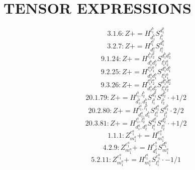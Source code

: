 \documentclass[letterpaper,10pt,fleqn,leqno,onecolumn]{article}
\begin{document}
\section{TENSOR EXPRESSIONS}
\begin{equation} \;\;\;\;\;\;  3.1.6: Z+=H^{l_{1}^{b}}_{d_{1}^{b}}S^{d_{1}^{b}}_{l_{1}^{b}} \end{equation}
\begin{equation} \;\;\;\;\;\;  3.2.7: Z+=H^{l_{1}^{a}}_{d_{1}^{a}}S^{d_{1}^{a}}_{l_{1}^{a}} \end{equation}
\begin{equation} \;\;\;\;\;\;  9.1.24: Z+=H^{l_{1}^{b}l_{2}^{b}}_{d_{1}^{b}d_{2}^{b}}S^{d_{1}^{b}d_{2}^{b}}_{l_{1}^{b}l_{2}^{b}} \end{equation}
\begin{equation} \;\;\;\;\;\;  9.2.25: Z+=H^{l_{1}^{a}l_{1}^{b}}_{d_{1}^{a}d_{1}^{b}}S^{d_{1}^{a}d_{1}^{b}}_{l_{1}^{a}l_{1}^{b}} \end{equation}
\begin{equation} \;\;\;\;\;\;  9.3.26: Z+=H^{l_{1}^{a}l_{2}^{a}}_{d_{1}^{a}d_{2}^{a}}S^{d_{1}^{a}d_{2}^{a}}_{l_{1}^{a}l_{2}^{a}} \end{equation}
\begin{equation} \;\;\;\;\;\;  20.1.79: Z+=H^{l_{1}^{b},l_{2}^{b}}_{d_{1}^{b},d_{2}^{b}}S^{d_{1}^{b}}_{l_{1}^{b}}S^{d_{2}^{b}}_{l_{2}^{b}}\cdot +1/2 \end{equation}
\begin{equation} \;\;\;\;\;\;  20.2.80: Z+=H^{l_{1}^{a},l_{1}^{b}}_{d_{1}^{a},d_{1}^{b}}S^{d_{1}^{a}}_{l_{1}^{a}}S^{d_{1}^{b}}_{l_{1}^{b}}\cdot 2/2 \end{equation}
\begin{equation} \;\;\;\;\;\;  20.3.81: Z+=H^{l_{1}^{a},l_{2}^{a}}_{d_{1}^{a},d_{2}^{a}}S^{d_{1}^{a}}_{l_{1}^{a}}S^{d_{2}^{a}}_{l_{2}^{a}}\cdot +1/2 \end{equation}
\begin{equation} \;\;\;\;\;\;  1.1.1: Z^{e_{1}^{a}}_{m_{1}^{a}}+=H^{e_{1}^{a}}_{m_{1}^{a}} \end{equation}
\begin{equation} \;\;\;\;\;\;  4.2.9: Z^{e_{1}^{a}}_{m_{1}^{a}}+=H^{e_{1}^{a}}_{d_{1}^{a}}S^{d_{1}^{a}}_{m_{1}^{a}} \end{equation}
\begin{equation} \;\;\;\;\;\;  5.2.11: Z^{e_{1}^{a}}_{m_{1}^{a}}+=H^{l_{1}^{a}}_{m_{1}^{a}}S^{e_{1}^{a}}_{l_{1}^{a}}\cdot -1/1 \end{equation}
\end{document}
